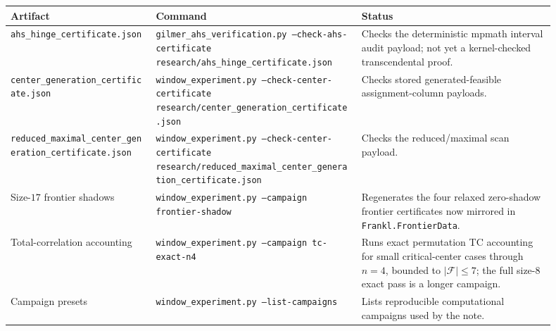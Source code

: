 \documentclass[11pt]{article}
\begin{document}
\begin{center}
\begin{tabular}{p{0.24\linewidth}p{0.34\linewidth}p{0.32\linewidth}}
\textbf{Artifact} & \textbf{Command} & \textbf{Status} \\
\hline
\texttt{ahs\_hinge\_certificate.json} &
\texttt{gilmer\_ahs\_verification.py --check-ahs-certificate
research/ahs\_hinge\_certificate.json} &
Checks the deterministic mpmath interval audit payload; not yet a
kernel-checked transcendental proof. \\
\texttt{center\_generation\_certificate.json} &
\texttt{window\_experiment.py --check-center-certificate
research/center\_generation\_certificate.json} &
Checks stored generated-feasible assignment-column payloads. \\
\texttt{reduced\_maximal\_center\_generation\_certificate.json} &
\texttt{window\_experiment.py --check-center-certificate
research/reduced\_maximal\_center\_generation\_certificate.json} &
Checks the reduced/maximal scan payload. \\
Size-$17$ frontier shadows &
\texttt{window\_experiment.py --campaign frontier-shadow} &
Regenerates the four relaxed zero-shadow frontier certificates now mirrored in
\texttt{Frankl.FrontierData}. \\
Total-correlation accounting &
\texttt{window\_experiment.py --campaign tc-exact-n4} &
Runs exact permutation TC accounting for small critical-center cases through
$n=4$, bounded to $|\mathcal{F}|\leq7$; the full size-$8$ exact pass is a
longer campaign. \\
Campaign presets &
\texttt{window\_experiment.py --list-campaigns} &
Lists reproducible computational campaigns used by the note. \\
\end{tabular}
\end{center}
\end{document}
